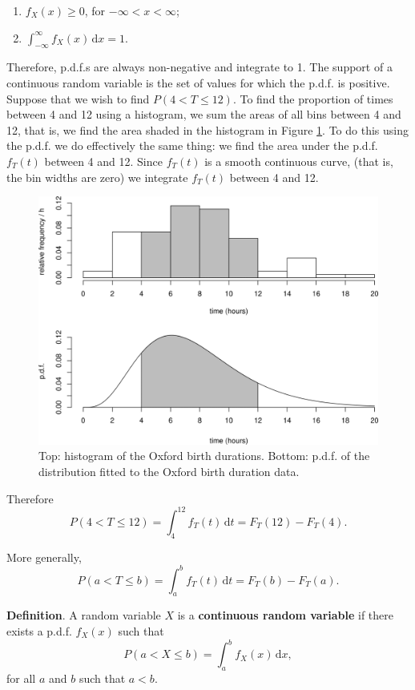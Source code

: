 \documentclass[
  11pt,
  british,
  openany, a4paper]{book}
\providecommand{\tightlist}{%
  \setlength{\itemsep}{0pt}\setlength{\parskip}{0pt}}
\begin{document}
\begin{enumerate}
\def\labelenumi{\arabic{enumi}.}
\tightlist
\item
  \(f_X(x) \geq 0\), for \(-\infty < x < \infty\);
\item
  \(\displaystyle\int_{-\infty}^{\infty} f_X(x) \, \mathrm{d}x = 1\).
\end{enumerate}

Therefore, p.d.f.s are always non-negative and integrate to 1. The support of a continuous random variable is the set of values for which the p.d.f. is positive. Suppose that we wish to find \(P(4 < T \leq 12)\). To find the proportion of times between 4 and 12 using a histogram, we sum the areas of all bins between 4 and 12, that is, we find the area shaded in the histogram in Figure \ref{fig:oxshady}. To do this using the p.d.f. we do effectively the same thing: we find the area under the p.d.f. \(f_T(t)\) between 4 and 12. Since \(f_T(t)\) is a smooth continuous curve, (that is, the bin widths are zero) we integrate \(f_T(t)\) between 4 and 12.

\begin{figure}

{\centering \includegraphics[width=0.75\linewidth]{images/ox_shady} 

}

\caption{Top: histogram of the Oxford birth durations. Bottom: p.d.f. of the distribution fitted to the Oxford birth duration data.}\label{fig:oxshady}
\end{figure}

Therefore
\[ P(4 < T \leq 12) = \displaystyle\int_4^{12} f_T(t) \,\mathrm{d}t = F_T(12)-F_T(4). \]

More generally,
\[ P(a < T \leq b) = \displaystyle\int_a^b f_T(t) \,\mathrm{d}t = F_T(b)-F_T(a). \]

\textbf{Definition}. A random variable \(X\) is a \textbf{continuous random variable} if there exists a p.d.f. \(f_X(x)\) such that
\[
P(a < X \leq b) = \int_{a}^{b} f_X(x) \,\mathrm{d}x,
\]
for all \(a\) and \(b\) such that \(a < b\).
\end{document}
